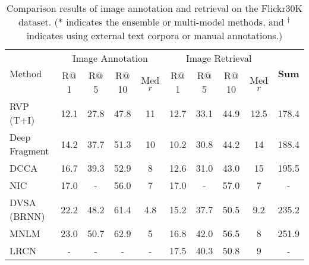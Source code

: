 \documentclass[10pt,twocolumn,letterpaper]{article}
\begin{document}
\begin{table*}[t] \small
\centering
\caption{Comparison results of image annotation and retrieval on the Flickr30K dataset. ($*$ indicates the ensemble or multi-model methods,
and $^{\dag}$ indicates using external text corpora or manual annotations.)}
\begin{tabular}{l|cccc|cccc|c}
\hline
\hline
\multirow{2}{0.7cm}{Method}     &  \multicolumn{4}{c|}{Image Annotation}  &  \multicolumn{4}{c|}{Image Retrieval} & \multirow{2}{0.7cm}{\textbf{Sum}}  \\
\cline{2-9}
     & R$@$1 & R$@$5  & R$@$10  & Med $r$  & R$@$1 & R$@$5  & R$@$10  & Med $r$ &    \\
\hline


RVP (T+I) \cite{chen2015mind}        &12.1 &27.8 &47.8 &11 &12.7 &33.1 &44.9 &12.5 & 178.4\\
Deep Fragment \cite{karpathy2014deep}  &14.2 &37.7 &51.3 &10 &10.2 &30.8 &44.2 &14 & 188.4\\
DCCA \cite{yan2015deep}           &16.7 &39.3 &52.9 &8 &12.6 &31.0 &43.0 &15 & 195.5\\
NIC \cite{vinyals2015show}           &17.0 &- &56.0 &7 &17.0 &- &57.0 &7 & -\\
DVSA (BRNN) \cite{karpathy2014vsa}    &22.2 &48.2 &61.4 &4.8 &15.2 &37.7 &50.5 &9.2 & 235.2\\
MNLM \cite{kiros2014unifying}        &23.0 &50.7 &62.9 &5 &16.8 &42.0 &56.5 &8 & 251.9\\
LRCN \cite{donahue2015long}            &- &- &- &- &17.5 &40.3 &50.8 &9 & -\\


\end{tabular}
\end{table*}
\end{document}
